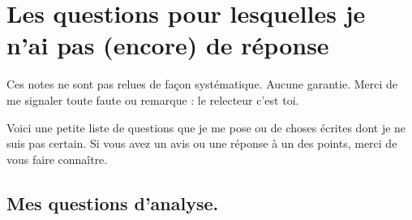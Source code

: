 

\section{Les questions pour lesquelles je n'ai pas (encore) de réponse}

Ces notes ne sont pas relues de façon systématique. Aucune garantie. Merci de me signaler toute faute ou remarque : le relecteur c'est toi.

Voici une petite liste de questions que je me pose ou de choses écrites dont je ne suis pas certain. Si vous avez un avis ou une réponse à un des points, merci de vous faire connaître.

\subsection{Mes questions d'analyse.}

